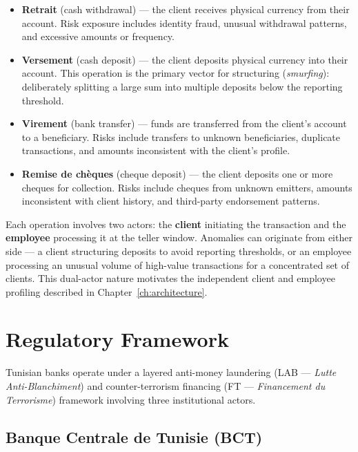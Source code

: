 \begin{itemize}
    \item \textbf{Retrait} (cash withdrawal) --- the client receives
          physical currency from their account. Risk exposure includes
          identity fraud, unusual withdrawal patterns, and excessive
          amounts or frequency.
    \item \textbf{Versement} (cash deposit) --- the client deposits
          physical currency into their account. This operation is the
          primary vector for structuring (\textit{smurfing}): deliberately
          splitting a large sum into multiple deposits below the reporting
          threshold.
    \item \textbf{Virement} (bank transfer) --- funds are transferred from
          the client's account to a beneficiary. Risks include transfers to
          unknown beneficiaries, duplicate transactions, and amounts
          inconsistent with the client's profile.
    \item \textbf{Remise de chèques} (cheque deposit) --- the client
          deposits one or more cheques for collection. Risks include
          cheques from unknown emitters, amounts inconsistent with
          client history, and third-party endorsement patterns.
\end{itemize}

Each operation involves two actors: the \textbf{client} initiating the
transaction and the \textbf{employee} processing it at the teller window.
Anomalies can originate from either side --- a client structuring deposits
to avoid reporting thresholds, or an employee processing an unusual volume
of high-value transactions for a concentrated set of clients. This
dual-actor nature motivates the independent client and employee profiling
described in Chapter~\ref{ch:architecture}.


\section{Regulatory Framework}
\label{sec:regulatory}

Tunisian banks operate under a layered anti-money laundering (LAB ---
\textit{Lutte Anti-Blanchiment}) and counter-terrorism financing (FT ---
\textit{Financement du Terrorisme}) framework involving three
institutional actors.

\subsection{Banque Centrale de Tunisie (BCT)}

